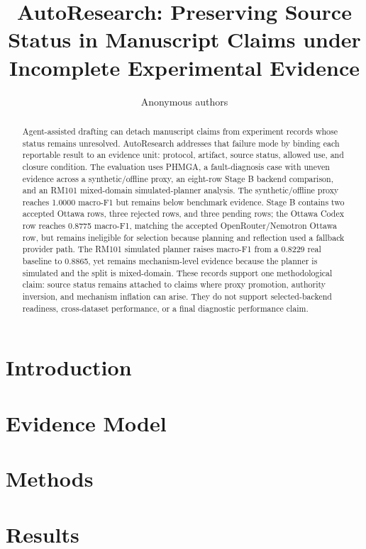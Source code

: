 \documentclass[11pt]{article}
\title{AutoResearch: Preserving Source Status in Manuscript Claims under Incomplete Experimental Evidence}
\author{Anonymous authors}
\date{}
\begin{document}
\maketitle

\begin{abstract}
Agent-assisted drafting can detach manuscript claims from experiment records whose status remains unresolved. AutoResearch addresses that failure mode by binding each reportable result to an evidence unit: protocol, artifact, source status, allowed use, and closure condition. The evaluation uses PHMGA, a fault-diagnosis case with uneven evidence across a synthetic/offline proxy, an eight-row Stage B backend comparison, and an RM101 mixed-domain simulated-planner analysis. The synthetic/offline proxy reaches 1.0000 macro-F1 but remains below benchmark evidence. Stage B contains two accepted Ottawa rows, three rejected rows, and three pending rows; the Ottawa Codex row reaches 0.8775 macro-F1, matching the accepted OpenRouter/Nemotron Ottawa row, but remains ineligible for selection because planning and reflection used a fallback provider path. The RM101 simulated planner raises macro-F1 from a 0.8229 real baseline to 0.8865, yet remains mechanism-level evidence because the planner is simulated and the split is mixed-domain. These records support one methodological claim: source status remains attached to claims where proxy promotion, authority inversion, and mechanism inflation can arise. They do not support selected-backend readiness, cross-dataset performance, or a final diagnostic performance claim.
\end{abstract}

\section{Introduction}


\section{Evidence Model}


\section{Methods}


\section{Results}

\end{document}
